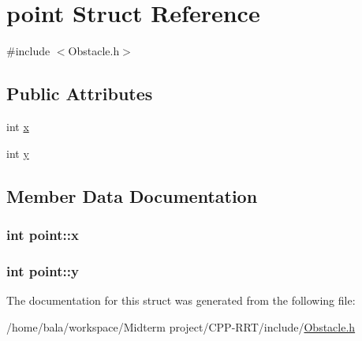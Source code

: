\hypertarget{structpoint}{}\section{point Struct Reference}
\label{structpoint}


{\ttfamily \#include $<$Obstacle.\+h$>$}

\subsection*{Public Attributes}
\begin{DoxyCompactItemize}
\item 
int \hyperlink{structpoint_ad679b07fb69d55f5ad454d0f1f2891d5}{x}
\item 
int \hyperlink{structpoint_a9a82ca9504acabb1e30569f89c805471}{y}
\end{DoxyCompactItemize}


\subsection{Member Data Documentation}
\subsubsection[{\texorpdfstring{x}{x}}]{\setlength{\rightskip}{0pt plus 5cm}int point\+::x}\hypertarget{structpoint_ad679b07fb69d55f5ad454d0f1f2891d5}{}\label{structpoint_ad679b07fb69d55f5ad454d0f1f2891d5}
\subsubsection[{\texorpdfstring{y}{y}}]{\setlength{\rightskip}{0pt plus 5cm}int point\+::y}\hypertarget{structpoint_a9a82ca9504acabb1e30569f89c805471}{}\label{structpoint_a9a82ca9504acabb1e30569f89c805471}


The documentation for this struct was generated from the following file\+:\begin{DoxyCompactItemize}
\item 
/home/bala/workspace/\+Midterm project/\+C\+P\+P-\/\+R\+R\+T/include/\hyperlink{Obstacle_8h}{Obstacle.\+h}\end{DoxyCompactItemize}
